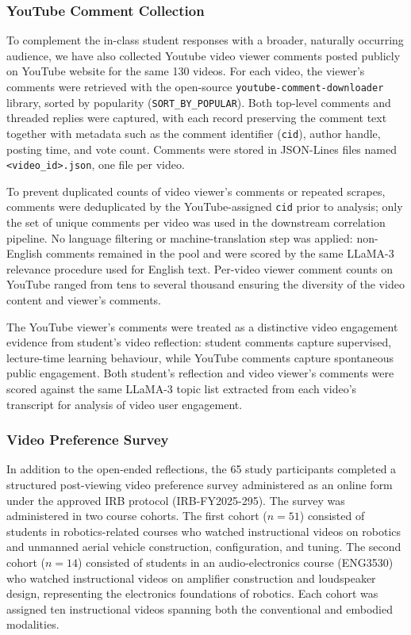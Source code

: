 \subsubsection{YouTube Comment Collection}

To complement the in-class student responses with a broader, naturally occurring audience, we have also collected Youtube video viewer comments posted publicly on YouTube website for the same 130 videos. For each video, the viewer's comments were retrieved with the open-source \texttt{youtube-comment-downloader} library, sorted by popularity (\texttt{SORT\_BY\_POPULAR}). Both top-level comments and threaded replies were captured, with each record preserving the comment text together with metadata such as the comment identifier (\texttt{cid}), author handle, posting time, and vote count. Comments were stored in JSON-Lines files named \texttt{<video\_id>.json}, one file per video.

To prevent duplicated counts of video viewer's comments or repeated scrapes, comments were deduplicated by the YouTube-assigned \texttt{cid} prior to analysis; only the set of unique comments per video was used in the downstream correlation pipeline. No language filtering or machine-translation step was applied: non-English comments remained in the pool and were scored by the same LLaMA-3 relevance procedure used for English text. Per-video viewer comment counts on YouTube ranged from tens to several thousand ensuring the diversity of the video content and viewer's comments. 

The YouTube viewer's comments were treated as a distinctive video engagement evidence from student's video reflection: student comments capture supervised, lecture-time learning behaviour, while YouTube comments capture spontaneous public engagement. Both student's reflection and video viewer's comments were scored against the same LLaMA-3 topic list extracted from each video's transcript for analysis of video user engagement.

\subsubsection{Video Preference Survey}
\label{sec:survey_method}

In addition to the open-ended reflections, the 65 study participants completed a structured post-viewing video preference survey administered as an online form under the approved IRB protocol (IRB-FY2025-295). The survey was administered in two course cohorts. The first cohort ($n = 51$) consisted of students in robotics-related courses who watched instructional videos on robotics and unmanned aerial vehicle construction, configuration, and tuning. The second cohort ($n = 14$) consisted of students in an audio-electronics course (ENG3530) who watched instructional videos on amplifier construction and loudspeaker design, representing the electronics foundations of robotics. Each cohort was assigned ten instructional videos spanning both the conventional and embodied modalities.

